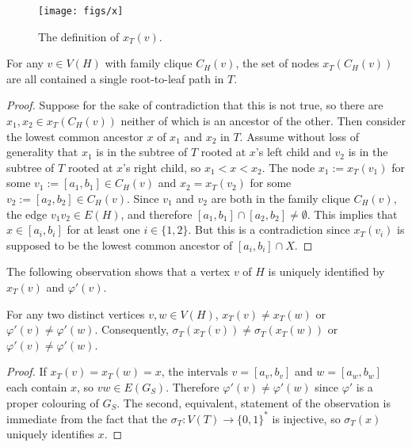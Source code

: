 \documentclass[kpfonts]{patmorin}
\begin{document}
\begin{figure}
  \begin{center}
    \texttt{[image: figs/x]}
  \end{center}
  \caption{The definition of $x_T(v)$.}
\end{figure}

\begin{lem}
  For any $v\in V(H)$ with family clique $C_H(v)$, the set of nodes $x_T(C_H(v))$ are all contained a single root-to-leaf path in $T$.
\end{lem}

\begin{proof}
  Suppose for the sake of contradiction that this is not true, so there are $x_1,x_2\in x_T(C_H(v))$ neither of which is an ancestor of the other.  Then consider the lowest common ancestor $x$ of $x_1$ and $x_2$ in $T$.  Assume without loss of generality that $x_1$ is in the subtree of $T$ rooted at $x$'s left child and $v_2$ is in the subtree of $T$ rooted at $x$'s right child, so $x_1<x<x_2$. The node $x_1:=x_T(v_1)$ for some $v_1:=[a_1,b_1]\in C_H(v)$ and $x_2=x_T(v_2)$ for some $v_2:=[a_2,b_2]\in C_H(v)$.  Since $v_1$ and $v_2$ are both in the family clique $C_H(v)$, the edge $v_1v_2\in E(H)$, and therefore $[a_1,b_1]\cap[a_2,b_2]\neq\emptyset$.  This implies that $x\in [a_i,b_i]$ for at least one $i\in\{1,2\}$.  But this is a contradiction since $x_T(v_i)$ is supposed to be the lowest common ancestor of $[a_i,b_i]\cap X$.
\end{proof}

The following observation shows that a vertex $v$ of $H$ is uniquely identified by $x_T(v)$ and $\varphi'(v)$.

\begin{obs}
    For any two distinct vertices $v,w\in V(H)$, $x_T(v)\neq x_T(w)$ or $\varphi'(v)\neq\varphi'(w)$.  Consequently, $\sigma_T(x_T(v))\neq \sigma_T(x_T(w))$ or $\varphi'(v)\neq\varphi'(w)$. 
\end{obs}

\begin{proof}
  If $x_T(v)=x_T(w)=x$, the intervals $v=[a_v,b_v]$ and $w=[a_w,b_w]$ each contain $x$, so $vw\in E(G_S)$.  Therefore $\varphi'(v)\neq\varphi'(w)$ since $\varphi'$ is a proper colouring of $G_S$.  The second, equivalent, statement of the observation is immediate from the fact that the $\sigma_T: V(T)\to\{0,1\}^*$ is injective, so $\sigma_T(x)$ uniquely identifies $x$.
\end{proof}
\end{document}
